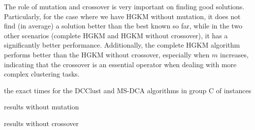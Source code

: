 

The role of mutation and crossover is very important on finding good solutions. Particularly, for the case where we have HGKM without mutation, it does not find (in average) a solution better than the best known so far, while in the two other scenarios (complete HGKM and HGKM without crossover), it has a significantly better performance. Additionally, the complete HGKM algorithm performs better than the HGKM without crossover, especially when $m$ increases, indicating that the crossover is an essential operator when dealing with more complex clustering tasks.

\noindent [TO-DO] the exact times for the DCClust and MS-DCA algorithms in group C of instances


\noindent [TO-DO] results without mutation

\noindent [TO-DO] results without crossover